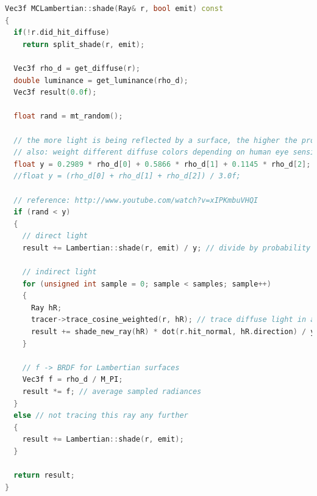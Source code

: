 \begin{lstlisting}[language=C++,caption=MCLambertian::shade,label=lst:mclambertian::shade,firstnumber=13]
Vec3f MCLambertian::shade(Ray& r, bool emit) const
{
  if(!r.did_hit_diffuse)
    return split_shade(r, emit);

  Vec3f rho_d = get_diffuse(r);
  double luminance = get_luminance(rho_d);
  Vec3f result(0.0f);
  
  float rand = mt_random();

  // the more light is being reflected by a surface, the higher the probability for reflection should be.
  // also: weight different diffuse colors depending on human eye sensitivity
  float y = 0.2989 * rho_d[0] + 0.5866 * rho_d[1] + 0.1145 * rho_d[2];
  //float y = (rho_d[0] + rho_d[1] + rho_d[2]) / 3.0f;
  
  // reference: http://www.youtube.com/watch?v=xIPKmbuVHQI
  if (rand < y)
  {
    // direct light
    result += Lambertian::shade(r, emit) / y; // divide by probability to make sure that monte carlo gives valid results

    // indirect light
    for (unsigned int sample = 0; sample < samples; sample++)
    { 
      Ray hR; 
      tracer->trace_cosine_weighted(r, hR); // trace diffuse light in a hemisphere
      result += shade_new_ray(hR) * dot(r.hit_normal, hR.direction) / y / samples;
    }
    
    // f -> BRDF for Lambertian surfaces
    Vec3f f = rho_d / M_PI;
    result *= f; // average sampled radiances
  }
  else // not tracing this ray any further
  {
    result += Lambertian::shade(r, emit);
  }

  return result;
}
\end{lstlisting}